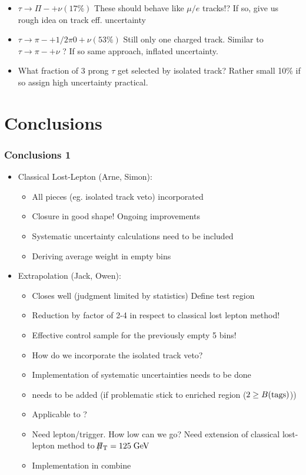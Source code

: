 \documentclass{beamer}
\begin{document}
\begin{frame}
\begin{columns}
\begin{column}{0.35\textwidth}
 \end{column}
\end{columns}
\begin{itemize}
 \item $\tau\rightarrow\Pi- + \nu(17\%)$ These should behave like $\mu/e$ tracks!? If so, give us rough idea on track eff. uncertainty
   \item $\tau\rightarrow\pi- + 1/2\pi0 + \nu(53\%)$ Still only one charged track. Similar to $\tau\rightarrow\pi- + \nu$ ? If so same approach, inflated uncertainty.
   \item What fraction of 3 prong $\tau$ get selected by isolated track? Rather small 10\% if so assign high uncertainty practical.
\end{itemize}
\end{frame}
\section{Conclusions}
\begin{frame}
 \frametitle{Conclusions 1}
 \begin{itemize}
  \item Classical Lost-Lepton (Arne, Simon):
  \begin{itemize}
   \item All pieces (eg. isolated track veto) incorporated
   \item Closure in good shape! Ongoing improvements
   \item Systematic uncertainty calculations need to be included
   \item Deriving average weight in empty bins
  \end{itemize}
  \item \MHT Extrapolation (Jack, Owen):
  \begin{itemize}
   \item Closes well (judgment limited by statistics) Define test region
   \item Reduction by factor of 2-4 in respect to classical lost lepton method!
   \item Effective control sample for the previously empty 5 bins!
   \item How do we incorporate the isolated track veto?
   \item Implementation of systematic uncertainties needs to be done
   \item \wpj needs to be added (if problematic stick to \ttbar enriched region ($2\ge B(\text{tags})$))
   \item Applicable to \hadtau?
   \item Need lepton/\met trigger. How low can we go? Need extension of classical lost-lepton method to $\slash\mkern-12mu{H}_{\text{T}} = 125 \;\text{Ge}\kern-0.06667em\text{V}$
   \item Implementation in combine
  \end{itemize}
 \end{itemize}
\end{frame}
\end{document}
